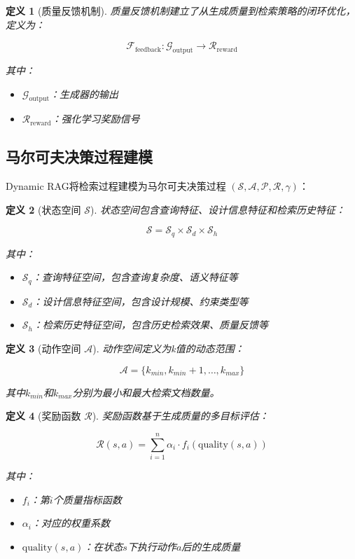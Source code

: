 \documentclass{ctexart}
\newtheorem{definition}{定义}
\begin{document}
\begin{definition}[质量反馈机制]
质量反馈机制建立了从生成质量到检索策略的闭环优化，定义为：

$$\mathcal{F}_{\text{feedback}}: \mathcal{G}_{\text{output}} \rightarrow \mathcal{R}_{\text{reward}}$$

其中：
\begin{itemize}
    \item $\mathcal{G}_{\text{output}}$：生成器的输出
    \item $\mathcal{R}_{\text{reward}}$：强化学习奖励信号
\end{itemize}
\end{definition}

\subsection{马尔可夫决策过程建模}

Dynamic RAG将检索过程建模为马尔可夫决策过程 $(\mathcal{S}, \mathcal{A}, \mathcal{P}, \mathcal{R}, \gamma)$：

\begin{definition}[状态空间 $\mathcal{S}$]
状态空间包含查询特征、设计信息特征和检索历史特征：

$$\mathcal{S} = \mathcal{S}_q \times \mathcal{S}_d \times \mathcal{S}_h$$

其中：
\begin{itemize}
    \item $\mathcal{S}_q$：查询特征空间，包含查询复杂度、语义特征等
    \item $\mathcal{S}_d$：设计信息特征空间，包含设计规模、约束类型等
    \item $\mathcal{S}_h$：检索历史特征空间，包含历史检索效果、质量反馈等
\end{itemize}
\end{definition}

\begin{definition}[动作空间 $\mathcal{A}$]
动作空间定义为k值的动态范围：

$$\mathcal{A} = \{k_{min}, k_{min}+1, \ldots, k_{max}\}$$

其中$k_{min}$和$k_{max}$分别为最小和最大检索文档数量。
\end{definition}

\begin{definition}[奖励函数 $\mathcal{R}$]
奖励函数基于生成质量的多目标评估：

$$\mathcal{R}(s, a) = \sum_{i=1}^{n} \alpha_i \cdot f_i(\text{quality}(s, a))$$

其中：
\begin{itemize}
    \item $f_i$：第$i$个质量指标函数
    \item $\alpha_i$：对应的权重系数
    \item $\text{quality}(s, a)$：在状态$s$下执行动作$a$后的生成质量
\end{itemize}
\end{definition}
\end{document}
